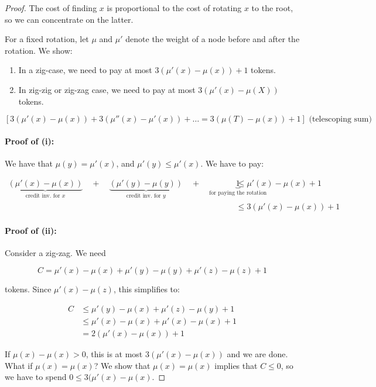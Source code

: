 \begin{proof}
The cost of finding $x$ is proportional to the cost of rotating $x$ to the root, so we can concentrate on the latter.

For a fixed rotation, let $\mu$ and $\mu'$ denote the weight of a node before and after the rotation. We show:

\begin{enumerate}
\item In a zig-case, we need to pay at most $3(\mu'(x) - \mu(x)) + 1$ tokens.
\item In zig-zig or zig-zag case, we need to pay at most $3(\mu'(x)-\mu(X))$ tokens.
\end{enumerate}

$$[3(\mu'(x)-\mu(x))+3(\mu''(x)-\mu'(x)) + \ldots = 3(\mu(T)-\mu(x))+1] \text{ (telescoping sum)}$$

\paragraph{Proof of (i):} We have that $\mu(y) = \mu'(x)$, and $\mu'(y) \le \mu'(x)$. We have to pay:

\begin{align*}
\underbrace{(\mu'(x) - \mu(x))}_\text{credit inv. for $x$} \quad + \quad \underbrace{(\mu'(y)-\mu(y))}_\text{credit inv. for $y$} \quad + \quad \underbrace{1}_\text{for paying the rotation}  
& \le \mu'(x) -\mu(x) + 1 \\
& \le 3(\mu'(x) - \mu(x)) + 1
\end{align*}

\paragraph{Proof of (ii):} Consider a zig-zag. We need

$$C = \mu'(x) - \mu(x) + \mu'(y) - \mu(y) + \mu'(z) - \mu(z) + 1$$

tokens. Since $\mu'(x) - \mu(z)$, this simplifies to:

\begin{align*}
C & \le \mu'(y) - \mu(x) + \mu'(z) - \mu(y) + 1 \\
& \le \mu'(x) - \mu(x) + \mu'(x) - \mu(x) + 1 \\
& = 2(\mu'(x) - \mu(x)) + 1
\end{align*}

If $\mu(x) - \mu(x) > 0$, this is at most $3(\mu'(x) - \mu(x))$ and we are done. What if $\mu(x) = \mu(x)$? We show that $\mu(x)=\mu(x)$ implies that $C\le 0$, so we have to spend $0 \le 3(\mu'(x)-\mu(x)$.


\end{proof}
